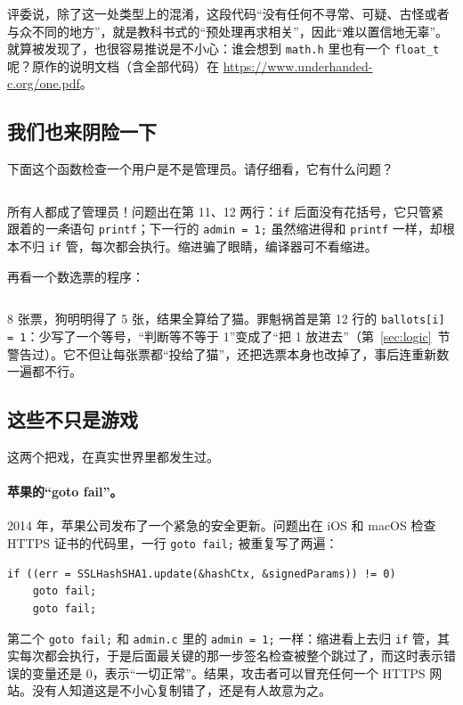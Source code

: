 评委说，除了这一处类型上的混淆，这段代码“没有任何不寻常、可疑、古怪或者与众不同的地方”，就是教科书式的“预处理再求相关”，因此“难以置信地无辜”。就算被发现了，也很容易推说是不小心：谁会想到 \texttt{math.h} 里也有一个 \texttt{float\_t} 呢？原作的说明文档（含全部代码）在 \url{https://www.underhanded-c.org/one.pdf}。

\subsection{我们也来阴险一下}

下面这个函数检查一个用户是不是管理员。请仔细看，它有什么问题？


\inputminted[linenos=false]{text}{code/appc/out/admin.txt}

所有人都成了管理员！问题出在第 11、12 两行：\texttt{if} 后面没有花括号，它只管紧跟着的\emph{一条}语句 \texttt{printf}；下一行的 \texttt{admin = 1;} 虽然缩进得和 \texttt{printf} 一样，却根本不归 \texttt{if} 管，每次都会执行。缩进骗了眼睛，编译器可不看缩进。

再看一个数选票的程序：


\inputminted[linenos=false]{text}{code/appc/out/vote.txt}

8 张票，狗明明得了 5 张，结果全算给了猫。罪魁祸首是第 12 行的 \texttt{ballots[i] = 1}：少写了一个等号，“判断等不等于 1”变成了“把 1 放进去”（第~\ref{sec:logic}~节警告过）。它不但让每张票都“投给了猫”，还把选票本身也改掉了，事后连重新数一遍都不行。

\subsection{这些不只是游戏}

这两个把戏，在真实世界里都发生过。

\paragraph{苹果的“goto fail”。}
2014 年，苹果公司发布了一个紧急的安全更新。问题出在 iOS 和 macOS 检查 HTTPS 证书的代码里，一行 \texttt{goto fail;} 被重复写了两遍：
\begin{verbatim}
if ((err = SSLHashSHA1.update(&hashCtx, &signedParams)) != 0)
    goto fail;
    goto fail;
\end{verbatim}
第二个 \texttt{goto fail;} 和 \texttt{admin.c} 里的 \texttt{admin = 1;} 一样：缩进看上去归 \texttt{if} 管，其实每次都会执行，于是后面最关键的那一步签名检查被整个跳过了，而这时表示错误的变量还是 0，表示“一切正常”。结果，攻击者可以冒充任何一个 HTTPS 网站。没有人知道这是不小心复制错了，还是有人故意为之。

